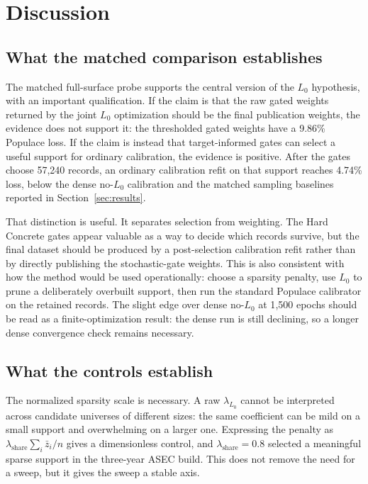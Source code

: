 \section{Discussion}
\label{sec:discussion}

\subsection{What the matched comparison establishes}

The matched full-surface probe supports the central version of the $L_0$ hypothesis, with an important
qualification. If the claim is that the raw gated weights returned by the joint $L_0$ optimization should
be the final publication weights, the evidence does not support it: the thresholded gated weights have a
9.86\% Populace loss. If the claim is instead that target-informed gates can select a useful support for
ordinary calibration, the evidence is positive. After the gates choose 57{,}240 records, an ordinary
calibration refit on that support reaches 4.74\% loss, below the dense no-$L_0$ calibration and the
matched sampling baselines reported in Section~\ref{sec:results}.

That distinction is useful. It separates selection from weighting. The Hard Concrete gates appear valuable
as a way to decide which records survive, but the final dataset should be produced by a post-selection
calibration refit rather than by directly publishing the stochastic-gate weights. This is also consistent
with how the method would be used operationally: choose a sparsity penalty, use $L_0$ to prune a
deliberately overbuilt support, then run the standard Populace calibrator on the retained records. The
slight edge over dense no-$L_0$ at 1{,}500 epochs should be read as a finite-optimization result: the
dense run is still declining, so a longer dense convergence check remains necessary.

\subsection{What the controls establish}

The normalized sparsity scale is necessary. A raw $\lambda_{L_0}$ cannot be interpreted across candidate
universes of different sizes: the same coefficient can be mild on a small support and overwhelming on a
larger one. Expressing the penalty as
$\lambda_{\mathrm{share}}\sum_i\bar{z}_i/n$ gives a dimensionless control, and
$\lambda_{\mathrm{share}}=0.8$ selected a meaningful sparse support in the three-year ASEC build. This does
not remove the need for a sweep, but it gives the sweep a stable axis.

